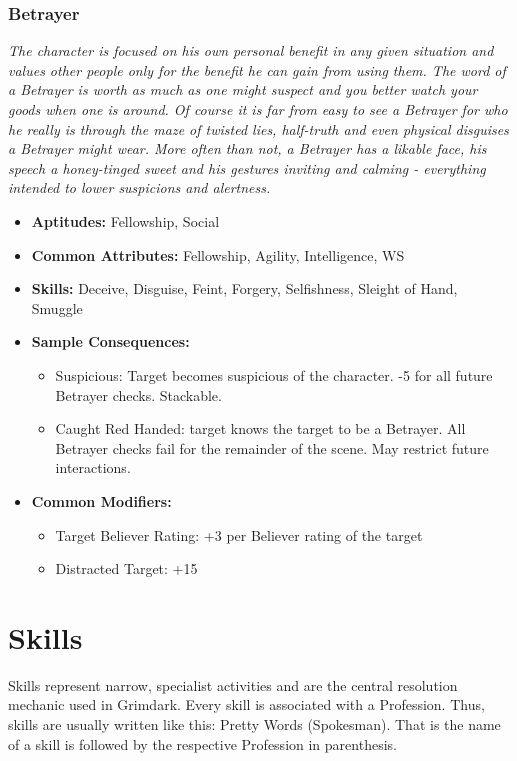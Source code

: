 \subsubsection{Betrayer}\label{Betrayer}
\textit{The character is focused on his own personal benefit in any given situation and values other people only for the benefit he can gain from using them.
The word of a Betrayer is worth as much as one might suspect and you better watch your goods when one is around.
Of course it is far from easy to see a Betrayer for who he really is through the maze of twisted lies, half-truth and even physical disguises a Betrayer might wear.
More often than not, a Betrayer has a likable face, his speech a honey-tinged sweet and his gestures inviting and calming - everything intended to lower suspicions and alertness.}
\begin{itemize}
	\item \textbf{Aptitudes:} Fellowship, Social
	\item \textbf{Common Attributes:}  Fellowship, Agility, Intelligence, WS
	\item \textbf{Skills:} Deceive, Disguise, Feint, Forgery, Selfishness, Sleight of Hand, Smuggle
	\item \textbf{Sample Consequences:} 
	\begin{itemize}
		\item Suspicious: Target becomes suspicious of the character. -5 for all future Betrayer checks. Stackable.
		\item Caught Red Handed: target knows the target to be a Betrayer. All Betrayer checks fail for the remainder of the scene. May restrict future interactions.
	\end{itemize}
	\item \textbf{Common Modifiers:}
	\begin{itemize}
		\item Target Believer Rating: +3 per Believer rating of the target
		\item Distracted Target: +15
	\end{itemize}
\end{itemize}


\section{Skills}%
\label{sec:skills}
Skills represent narrow, specialist activities and are the central resolution mechanic used in Grimdark. 
Every skill is associated with a Profession.
Thus, skills are usually written like this: Pretty Words (Spokesman).
That is the name of a skill is followed by the respective Profession in parenthesis.

